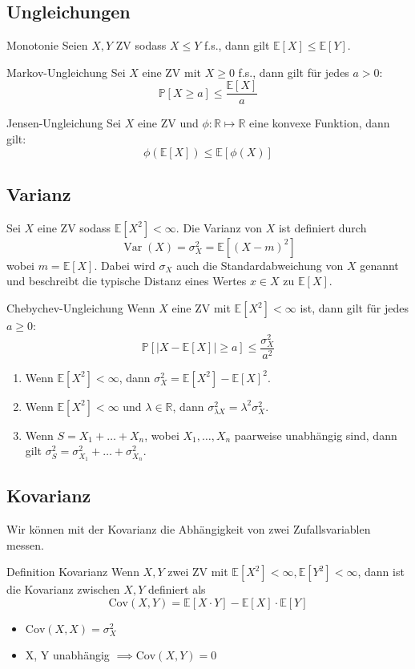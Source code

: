 \documentclass[a4paper,10pt]{article}
\def\R{\mathbb{R}}
\def\P{\mathbb{P}}
\def\E{\mathbb{E}}
\DeclareMathOperator{\Var}{\text{Var}}
\begin{document}
\subsection{Ungleichungen}
\begin{subbox}{Monotonie}
	Seien \(X, Y\) ZV sodass \(X \le Y\) f.s., dann gilt \(\E[X] \le \E[Y]\).
\end{subbox}

\begin{mainbox}{Markov-Ungleichung}
	Sei \(X\) eine ZV mit \(X \ge 0\) f.s., dann gilt für jedes \(a > 0\):
	\[\P[X\ge a] \le \frac{\E[X]}{a}\]
\end{mainbox}

\begin{subbox}{Jensen-Ungleichung}
	Sei \(X\) eine ZV und \(\phi : \R \mapsto \R\) eine konvexe Funktion, dann gilt:
	\[\phi(\E[X]) \le \E[\phi(X)]\]
\end{subbox}

\subsection{Varianz}
Sei \(X\) eine ZV sodass \(\E[X^2] < \infty\). Die Varianz von \(X\) ist definiert durch
\[\Var(X) = \sigma_X^2 = \E[(X-m)^2]\]
wobei \(m=\E[X]\). Dabei wird \(\sigma_X\) auch die Standardabweichung von \(X\) genannt und beschreibt die typische Distanz eines Wertes \(x\in X\) zu \(\E[X]\).

\begin{subbox}{Chebychev-Ungleichung}
	Wenn \(X\) eine ZV mit \(\E[X^2] < \infty\) ist, dann gilt für jedes \(a \ge 0\):
	\[\P[|X - \E[X]| \ge a] \le \frac{\sigma_X^2}{a^2}\]
\end{subbox}

\begin{enumerate}
	\item Wenn \(\E[X^2] < \infty\), dann \(\sigma_X^2 = \E[X^2] - \E[X]^2\).
	\item Wenn \(\E[X^2] < \infty\) und \(\lambda \in \R\), dann \(\sigma_{\lambda X}^2 = \lambda^2\sigma_X^2\).
	\item Wenn \(S = X_1 + \ldots + X_n\), wobei \(X_1, \ldots, X_n\) paarweise unabhängig sind, dann gilt \(\sigma_S^2 = \sigma_{X_1}^2 + \ldots + \sigma_{X_n}^2\).
\end{enumerate}

\subsection{Kovarianz}
Wir können mit der Kovarianz die Abhängigkeit von zwei Zufallsvariablen messen.
\begin{subbox}{Definition Kovarianz}
	Wenn \(X, Y\) zwei ZV mit \(\E[X^2] < \infty, \E[Y^2] < \infty\), dann ist die Kovarianz zwischen \(X, Y\) definiert als
	\[\text{Cov}(X,Y) = \E[X \cdot Y] - \E[X] \cdot \E[Y]\]
\end{subbox}
\begin{itemize}
	\item \(\text{Cov}(X,X) = \sigma_X^2\)
	\item X, Y unabhängig \(\implies \text{Cov}(X,Y) = 0\)
\end{itemize}
\end{document}
